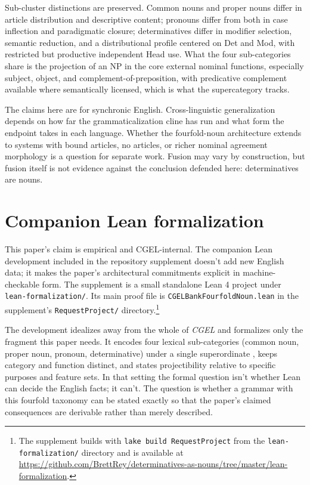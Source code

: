 \documentclass[12pt]{article}
\begin{document}
Sub-cluster distinctions are preserved. Common nouns and proper nouns differ in article distribution and descriptive content; pronouns differ from both in case inflection and paradigmatic closure; determinatives differ in modifier selection, semantic reduction, and a distributional profile centered on Det and Mod, with restricted but productive independent Head use. What the four sub-categories share is the projection of an NP in the core external nominal functions, especially subject, object, and complement-of-preposition, with predicative complement available where semantically licensed, which is what the supercategory tracks.

The claims here are for synchronic English. Cross-linguistic generalization depends on how far the grammaticalization cline has run and what form the endpoint takes in each language. Whether the fourfold-noun architecture extends to systems with bound articles, no articles, or richer nominal agreement morphology is a question for separate work. Fusion may vary by construction, but fusion itself is not evidence against the conclusion defended here: determinatives are nouns.

\newpage
\appendix

\section{Companion Lean formalization}\label{sec:lean-appendix}

This paper's claim is empirical and CGEL-internal. The companion Lean development included in the repository supplement doesn't add new English data; it makes the paper's architectural commitments explicit in machine-checkable form. The supplement is a small standalone Lean 4 project under \texttt{lean-formalization/}. Its main proof file is \texttt{CGELBankFourfoldNoun.lean} in the supplement's \texttt{RequestProject/} directory.\footnote{The supplement builds with \texttt{lake build RequestProject} from the \texttt{lean-formalization/} directory and is available at \url{https://github.com/BrettRey/determinatives-as-nouns/tree/master/lean-formalization}.}

The development idealizes away from the whole of \textit{CGEL} and formalizes only the fragment this paper needs. It encodes four lexical sub-categories (common noun, proper noun, pronoun, determinative) under a single superordinate , keeps category and function distinct, and states projectibility relative to specific purposes and feature sets. In that setting the formal question isn't whether Lean can decide the English facts; it can't. The question is whether a grammar with this fourfold taxonomy can be stated exactly so that the paper's claimed consequences are derivable rather than merely described.
\end{document}
